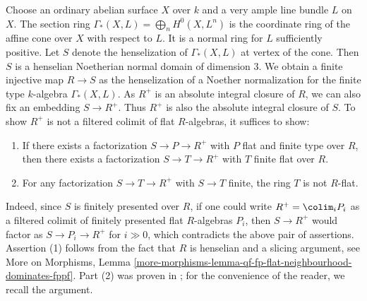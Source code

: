 \medskip\noindent
Choose an ordinary abelian surface $X$ over $k$ and a very ample line bundle
$L$ on $X$. The section ring $\Gamma_*(X, L) = \bigoplus_n H^0(X,L^n)$ is
the coordinate ring of the affine cone over $X$ with respect to $L$. It is
a normal ring for $L$ sufficiently positive. Let $S$ denote the henselization
of $\Gamma_*(X, L)$ at vertex of the cone. Then $S$ is a henselian Noetherian
normal domain of dimension $3$. We obtain a finite injective
map $R \to S$ as the henselization of a Noether normalization
for the finite type $k$-algebra $\Gamma_*(X, L)$. As $R^+$ is an
absolute integral closure of $R$, we can also fix an embedding $S \to R^+$.
Thus $R^+$ is also the absolute integral closure of $S$. To show $R^+$
is not a filtered colimit of flat $R$-algebras, it suffices to show:
\begin{enumerate}
\item If there exists a factorization $S \to P \to R^+$ with $P$ flat
and finite type over $R$, then there exists a factorization
$S \to T \to R^+$ with $T$ finite flat over $R$.
\item For any factorization $S \to T \to R^+$ with $S \to T$ finite,
the ring $T$ is not $R$-flat.
\end{enumerate}
Indeed, since $S$ is finitely presented over $R$, if one could write
$R^+ = \colim_i P_i$ as a filtered colimit of finitely presented flat
$R$-algebras $P_i$, then $S \to R^+$ would factor as $S \to P_i \to R^+$
for $i \gg 0$, which contradicts the above pair of assertions.
Assertion (1) follows from the fact that $R$ is henselian and a
slicing argument, see More on Morphisms, Lemma
\ref{more-morphisms-lemma-qf-fp-flat-neighbourhood-dominates-fppf}.
Part (2) was proven in \cite{BhattSmallCMMod}; for the convenience of
the reader, we recall the argument.

